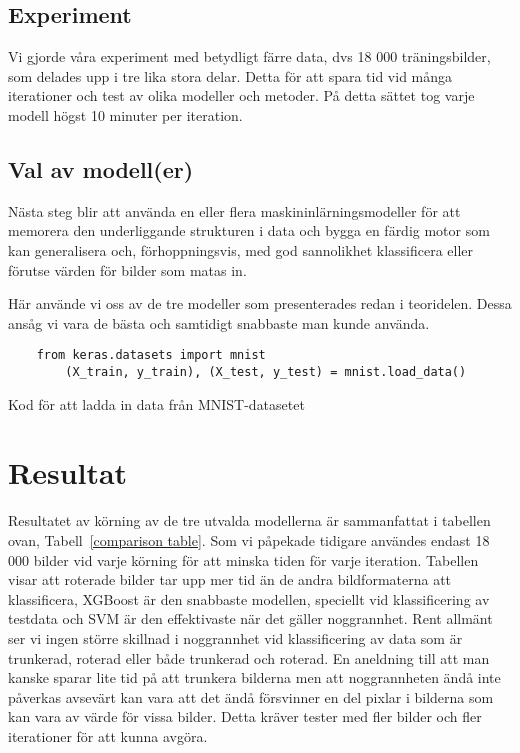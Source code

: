 \documentclass[12pt,a4paper]{article}
\begin{document}
\subsection{Experiment}

Vi gjorde våra experiment med betydligt färre data, dvs 18 000 träningsbilder, som delades upp i tre lika stora delar. Detta för att spara tid vid många iterationer och test av olika modeller och metoder. På detta sättet tog varje modell högst 10 minuter per iteration. 

\subsection{Val av modell(er)}

Nästa steg blir att använda en eller flera maskininlärningsmodeller för att memorera den underliggande strukturen i data och bygga en färdig motor som kan generalisera och, förhoppningsvis, med god sannolikhet klassificera eller förutse värden för bilder som matas in.

Här använde vi oss av de tre modeller som presenterades redan i teoridelen. Dessa ansåg vi vara de bästa och samtidigt snabbaste man kunde använda. 

\begin{table}[t]
	\footnotesize
  \begin{verbatim}
	from keras.datasets import mnist
    	(X_train, y_train), (X_test, y_test) = mnist.load_data()
  \end{verbatim}
  \caption{\footnotesize{Kod för att ladda in data från MNIST-datasetet}}
\end{table}

\section{Resultat}

Resultatet av körning av de tre utvalda modellerna är sammanfattat i tabellen ovan, Tabell~\ref{comparison table}. Som vi påpekade tidigare användes endast 18 000 bilder vid varje körning för att minska tiden för varje iteration. Tabellen visar att roterade bilder tar upp mer tid än de andra bildformaterna att klassificera, XGBoost är den snabbaste modellen, speciellt vid klassificering av testdata och SVM är den effektivaste när det gäller noggrannhet. Rent allmänt ser vi ingen större skillnad i noggrannhet vid klassificering av data som är trunkerad, roterad eller både trunkerad och roterad. En aneldning till att man kanske sparar lite tid på att trunkera bilderna men att noggrannheten ändå inte påverkas avsevärt kan vara att det ändå försvinner en del pixlar i bilderna som kan vara av värde för vissa bilder. Detta kräver tester med fler bilder och fler iterationer för att kunna avgöra.
\end{document}
